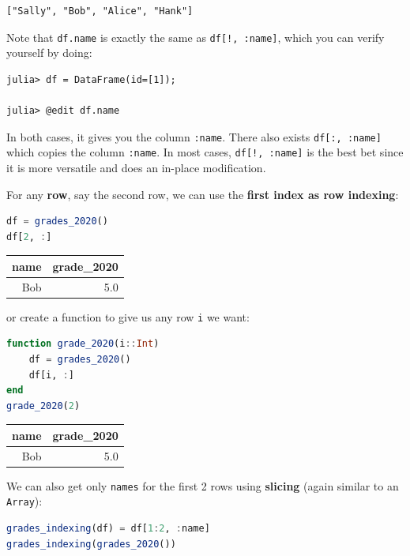 \documentclass[
  notoc %
]{tufte-book}
\newcommand{\passthrough}[1]{#1}
\begin{document}
\begin{lstlisting}[language=Output]
["Sally", "Bob", "Alice", "Hank"]
\end{lstlisting}

Note that \passthrough{\lstinline!df.name!} is exactly the same as
\passthrough{\lstinline"df[!, :name]"}, which you can verify yourself by
doing:

\begin{lstlisting}
julia> df = DataFrame(id=[1]);

julia> @edit df.name
\end{lstlisting}

In both cases, it gives you the column \passthrough{\lstinline!:name!}.
There also exists \passthrough{\lstinline!df[:, :name]!} which copies
the column \passthrough{\lstinline!:name!}. In most cases,
\passthrough{\lstinline"df[!, :name]"} is the best bet since it is more
versatile and does an in-place modification.

For any \textbf{row}, say the second row, we can use the \textbf{first
index as row indexing}:

\begin{lstlisting}[language=Julia]
df = grades_2020()
df[2, :]
\end{lstlisting}

\begin{longtable}[]{@{}rr@{}}
\toprule
name & grade\_2020 \\
\midrule
\endhead
Bob & 5.0 \\
\bottomrule
\end{longtable}

or create a function to give us any row \passthrough{\lstinline!i!} we
want:

\begin{lstlisting}[language=Julia]
function grade_2020(i::Int)
    df = grades_2020()
    df[i, :]
end
grade_2020(2)
\end{lstlisting}

\begin{longtable}[]{@{}rr@{}}
\toprule
name & grade\_2020 \\
\midrule
\endhead
Bob & 5.0 \\
\bottomrule
\end{longtable}

We can also get only \passthrough{\lstinline!names!} for the first 2
rows using \textbf{slicing} (again similar to an
\passthrough{\lstinline!Array!}):

\begin{lstlisting}[language=Julia]
grades_indexing(df) = df[1:2, :name]
grades_indexing(grades_2020())
\end{lstlisting}
\end{document}
